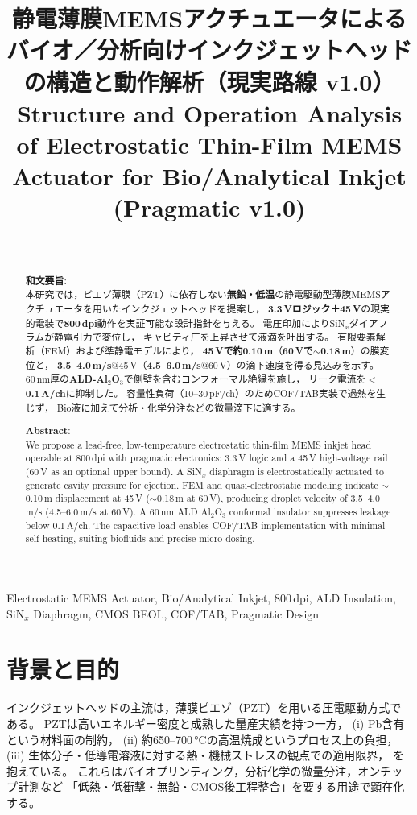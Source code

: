 \documentclass[conference]{IEEEtran}
\title{静電薄膜MEMSアクチュエータによるバイオ／分析向けインクジェットヘッドの構造と動作解析（現実路線 v1.0）\\
\large Structure and Operation Analysis of Electrostatic Thin-Film MEMS Actuator for Bio/Analytical Inkjet (Pragmatic v1.0)}
\author{%
  \IEEEauthorblockN{三溝 真一（Shinichi Samizo)}\\
  \IEEEauthorblockA{独立系半導体研究者（元セイコーエプソン）\\
  Email: \href{mailto:shin3t72@gmail.com}{shin3t72@gmail.com}\\
  GitHub: \url{https://github.com/Samizo-AITL}}%
}
\begin{document}
\maketitle

\begin{abstract}
\textbf{和文要旨}:\\
本研究では，ピエゾ薄膜（PZT）に依存しない\textbf{無鉛・低温}の静電駆動型薄膜MEMSアクチュエータを用いたインクジェットヘッドを提案し，
\textbf{3.3\,Vロジック＋45\,V}の現実的電装で\textbf{800\,dpi}動作を実証可能な設計指針を与える。
電圧印加によりSiN$_x$ダイアフラムが静電引力で変位し，
キャビティ圧を上昇させて液滴を吐出する。
有限要素解析（FEM）および準静電モデルにより，
\textbf{45\,Vで約0.10\,\textmu m}（\textbf{60\,Vで$\sim$0.18\,\textmu m}）の膜変位と，
\textbf{3.5--4.0\,m/s}@45\,V（\textbf{4.5--6.0\,m/s}@60\,V）の滴下速度を得る見込みを示す。
60\,nm厚の\textbf{ALD-Al$_2$O$_3$}で側壁を含むコンフォーマル絶縁を施し，
リーク電流を\textbf{$<$0.1\,\textmu A/ch}に抑制した。
容量性負荷（10--30\,pF/ch）のためCOF/TAB実装で過熱を生じず，
Bio液に加えて分析・化学分注などの微量滴下に適する。

\medskip
\noindent\textbf{Abstract}:\\
We propose a lead-free, low-temperature electrostatic thin-film MEMS inkjet head operable at 800\,dpi with pragmatic electronics: 3.3\,V logic and a 45\,V high-voltage rail (60\,V as an optional upper bound).
A SiN$_x$ diaphragm is electrostatically actuated to generate cavity pressure for ejection.
FEM and quasi-electrostatic modeling indicate $\sim$0.10\,\textmu m displacement at 45\,V ($\sim$0.18\,\textmu m at 60\,V),
producing droplet velocity of 3.5--4.0\,m/s (4.5--6.0\,m/s at 60\,V).
A 60\,nm ALD Al$_2$O$_3$ conformal insulator suppresses leakage below 0.1\,\textmu A/ch.
The capacitive load enables COF/TAB implementation with minimal self-heating,
suiting biofluids and precise micro-dosing.
\end{abstract}

\begin{IEEEkeywords}
Electrostatic MEMS Actuator, Bio/Analytical Inkjet, 800\,dpi, ALD Insulation,
SiN$_x$ Diaphragm, CMOS BEOL, COF/TAB, Pragmatic Design
\end{IEEEkeywords}

\section{背景と目的}
インクジェットヘッドの主流は，薄膜ピエゾ（PZT）を用いる圧電駆動方式である。
PZTは高いエネルギー密度と成熟した量産実績を持つ一方，
(i) Pb含有という材料面の制約，
(ii) 約650--700\,\si{\celsius}の高温焼成というプロセス上の負担，
(iii) 生体分子・低導電溶液に対する熱・機械ストレスの観点での適用限界，
を抱えている。
これらはバイオプリンティング，分析化学の微量分注，オンチップ計測など
「低熱・低衝撃・無鉛・CMOS後工程整合」を要する用途で顕在化する。
\end{document}
